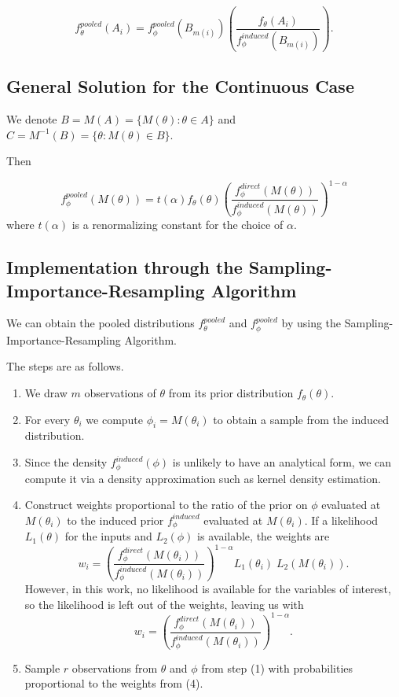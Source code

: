 \documentclass[12pt,twoside]{smiththesis}
\providecommand{\tightlist}{%
  \setlength{\itemsep}{0pt}\setlength{\parskip}{0pt}}
\begin{document}
\[f_\theta^{pooled}(A_i) = f_\phi^{pooled}(B_{m(i)}) \left( \frac{f_\theta(A_i)}{f_\phi^{induced}(B_{m(i)})} \right).\]

\hypertarget{general-solution-for-the-continuous-case}{%
\subsection{General Solution for the Continuous Case}\label{general-solution-for-the-continuous-case}}

We denote \(B = M(A) = \{M(\theta) : \theta \in A \}\) and \(C = M^{-1}(B) = \{\theta: M(\theta) \in B \}\).

Then

\[
f_\phi^{pooled} (M(\theta)) =t({\alpha}) f_\theta(\theta) \left( \frac{f_\phi^{direct}(M(\theta))}{f_\phi^{induced}(M(\theta))} \right)^{1-\alpha} \tag{2}
\]
where \(t({\alpha})\) is a renormalizing constant for the choice of \(\alpha\).

\newpage

\hypertarget{implementation-through-the-sampling-importance-resampling-algorithm}{%
\subsection{Implementation through the Sampling-Importance-Resampling Algorithm}\label{implementation-through-the-sampling-importance-resampling-algorithm}}

We can obtain the pooled distributions \(f^{pooled}_\theta\) and \(f^{pooled}_\phi\) by using the Sampling-Importance-Resampling Algorithm.

The steps are as follows.
\begin{enumerate}
\def\labelenumi{\arabic{enumi}.}
\tightlist
\item
  We draw \(m\) observations of \(\theta\) from its prior distribution \(f_\theta(\theta)\).
\item
  For every \(\theta_i\) we compute \(\phi_i = M(\theta_i)\) to obtain a sample from the induced distribution.
\item
  Since the density \(f_\phi^{induced}(\phi)\) is unlikely to have an analytical form, we can compute it via a density approximation such as kernel density estimation.
\item
  Construct weights proportional to the ratio of the prior on \(\phi\) evaluated at \(M(\theta_i)\) to the induced prior \(f_\phi^{induced}\) evaluated at \(M(\theta_i)\). If a likelihood \(L_1(\theta)\) for the inputs and \(L_2(\phi)\) is available, the weights are
  \[w_i = \left( \frac{f_\phi^{direct}(M(\theta_i))}{f_\phi^{induced}(M(\theta_i))} \right)^{1-\alpha}L_1(\theta_i) \; L_2(M(\theta_i)).\]
  However, in this work, no likelihood is available for the variables of interest, so the likelihood is left out of the weights, leaving us with
  \[w_i = \left( \frac{f_\phi^{direct}(M(\theta_i))}{f_\phi^{induced}(M(\theta_i))} \right)^{1-\alpha}.\]
\item
  Sample \(r\) observations from \(\theta\) and \(\phi\) from step (1) with probabilities proportional to the weights from (4).
\end{enumerate}
\newpage
\end{document}
